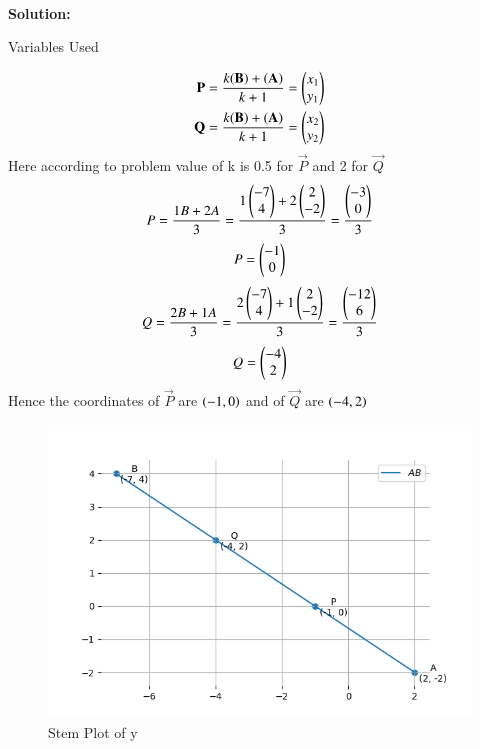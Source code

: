 \documentclass[journal]{IEEEtran}
\begin{document}
\hfill{}\\
\textbf{Solution: }
\begin{table}[h!]    
  \centering
  
  \caption{Variables Used}
  \label{tab10.5.3.9.1}
\end{table}
\begin{align}
\mathbf{P}=\frac{k(\mathbf{B})+(\mathbf{A})}{k+1}=\begin{pmatrix}x_1\\y_1\end{pmatrix}\\ 
   \mathbf{Q}=\frac{k(\mathbf{B})+(\mathbf{A})}{k+1}=\begin{pmatrix}x_2\\y_2\end{pmatrix}
\end{align}
Here according to problem value of k is 0.5 for $\vec{P}$ and 2 for $\vec{Q}$\\
\begin{align}
P=\frac{1B+2A}{3}=\frac{1\begin{pmatrix}-7\\4\end{pmatrix}+2\begin{pmatrix}2\\-2\end{pmatrix}}{3}=\frac{\begin{pmatrix}-3\\0\end{pmatrix}}{3}\\
\end{align}
\begin{align}
P=\begin{pmatrix}-1\\0\end{pmatrix}
\end{align}
\begin{align}
Q=\frac{2B+1A}{3}=\frac{2\begin{pmatrix}-7\\4\end{pmatrix}+1\begin{pmatrix}2\\-2\end{pmatrix}}{3}=\frac{\begin{pmatrix}-12\\6\end{pmatrix}}{3}\\
\end{align}
\begin{align}
Q=\begin{pmatrix}-4\\2\end{pmatrix}
\end{align}
Hence the coordinates of $\vec{P}$ are $\left(-1,0\right)$ and of $\vec{Q}$ are $\left(-4,2\right)$
\begin{figure}[h!]
   \centering
   \includegraphics[width=0.7\linewidth]{figs/Fig2.png}
   \caption{Stem Plot of y}
   \label{stemplot}
\end{figure}
\end{document}
